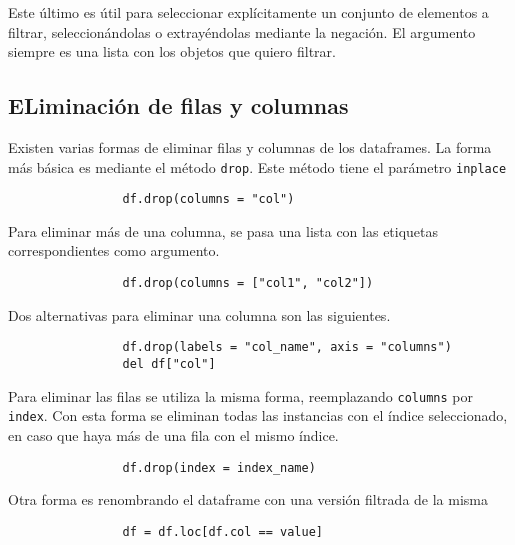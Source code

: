                 Este último es útil para seleccionar explícitamente un conjunto de elementos a filtrar, seleccionándolas o extrayéndolas mediante la negación. El argumento siempre es una lista con los objetos que quiero filtrar.

        \subsection{ELiminación de filas y columnas}

            Existen varias formas de eliminar filas y columnas de los dataframes. La forma más básica es mediante el método \texttt{drop}. Este método tiene el parámetro \texttt{inplace}

            \begin{verbatim}
                df.drop(columns = "col")    
            \end{verbatim}

            Para eliminar más de una columna, se pasa una lista con las etiquetas correspondientes como argumento.


            \begin{verbatim}
                df.drop(columns = ["col1", "col2"])    
            \end{verbatim}

            Dos alternativas para eliminar una columna son las siguientes.

            \begin{verbatim}
                df.drop(labels = "col_name", axis = "columns")
                del df["col"]
            \end{verbatim}

            Para eliminar las filas se utiliza la misma forma, reemplazando \texttt{columns} por \texttt{index}. Con esta forma se eliminan todas las instancias con el índice seleccionado, en caso que haya más de una fila con el mismo índice.

            \begin{verbatim}
                df.drop(index = index_name)
            \end{verbatim}

            Otra forma es renombrando el dataframe con una versión filtrada de la misma

            \begin{verbatim}
                df = df.loc[df.col == value]
            \end{verbatim}

